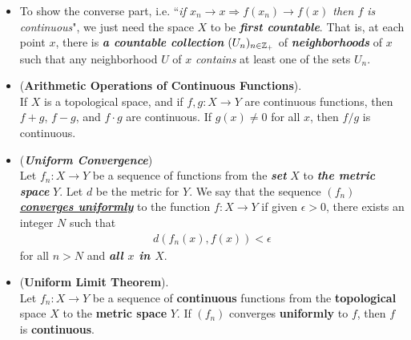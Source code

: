 \documentclass[11pt]{article}
\begin{document}
\begin{itemize}
\item \begin{remark}
To show the converse part, i.e. ``\emph{if $x_n \rightarrow x \Rightarrow f(x_n) \rightarrow f(x)$ then $f$ is continuous}", we just need the space $X$ to be \emph{\textbf{first countable}}. That is, at each point $x$, there is \emph{\textbf{a countable collection}} $(U_{n})_{n \in {\mathbb Z}_{+}}$ of \emph{\textbf{neighborhoods}} of $x$ such that any neighborhood $U$ of $x$ \emph{contains} at least one of the sets $U_n$.
\end{remark}

\item \begin{proposition} (\textbf{Arithmetic Operations of Continuous Functions}).\\
If $X$ is a topological space, and if $f, g : X \rightarrow Y$ are continuous functions, then $f + g$,  $f - g$, and $f \cdot g$ are continuous. If $g(x) \neq 0$ for all $x$, then $f/g$ is continuous.
\end{proposition}

\item \begin{definition} (\emph{\textbf{Uniform Convergence}})\\
Let $f_n : X \rightarrow Y$ be a sequence of functions from the \textbf{\emph{set}} $X$ to \emph{\textbf{the metric space}} $Y$. Let $d$ be the metric for $Y$. We say that the sequence $(f_n)$ \underline{\emph{\textbf{converges uniformly}}} to the function $f: X \rightarrow Y$ if given $\epsilon > 0$, there exists an integer $N$ such that
\begin{align*}
d(f_n(x), f(x)) < \epsilon
\end{align*}
for all $n > N$ and \textbf{\emph{all $x$ in $X$}}.
\end{definition}

\item \begin{theorem} (\textbf{Uniform Limit Theorem}). \citep{munkres2000topology}\\
Let $f_n : X \rightarrow Y$ be a sequence of  \textbf{continuous} functions from the \textbf{topological} space $X$ to the \textbf{metric space} $Y$. If $(f_n)$ converges
\textbf{uniformly} to $f$, then $f$ is \textbf{continuous}.
\end{theorem}
\end{itemize}
\end{document}
